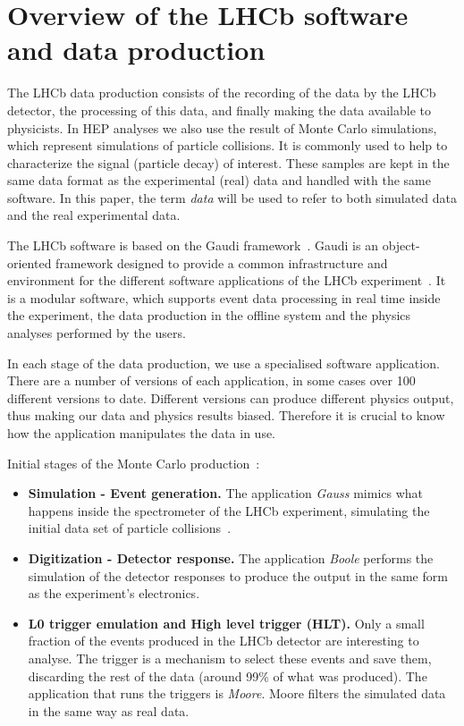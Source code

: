 \section{Overview of the LHCb software and data production}

The LHCb data production consists of the recording of the data by the LHCb detector, the processing of this data, and finally making the data available to physicists. In HEP analyses we also use the result of Monte Carlo simulations, which represent simulations of particle collisions. It is commonly used to help to characterize the signal (particle decay) of interest. These samples are kept in the same data format as the experimental (real) data and handled with the same software. In this paper, the term \emph{data} will be used to refer to both simulated data and the real experimental data.

The LHCb software is based on the Gaudi framework~\cite{barrand2001gaudi}. Gaudi is an object-oriented framework designed to provide a common infrastructure and environment for the different software applications of the LHCb experiment~\cite{corti2006software}. It is a modular software, which supports event data processing in real time inside the experiment, the data production in the offline system and the physics analyses performed by the users.

In each stage of the data production, we use a specialised software application. There are a number of versions of each application, in some cases over 100 different versions to date. Different versions can produce different physics output, thus making our data and physics results biased. Therefore it is crucial to know how the application manipulates the data in use. 


Initial stages of the Monte Carlo production~\cite{corti2015monte}:
\begin{itemize}
    \item \textbf{Simulation - Event generation.} The application {\it Gauss} mimics what happens inside the spectrometer of the LHCb experiment, simulating the initial data set of particle collisions~\cite{corti2006software}.
    \item \textbf{Digitization - Detector response.} The application {\it Boole} performs the simulation of the detector responses to produce the output in the same form as the experiment's electronics. 
    \item \textbf{L0 trigger emulation and  High level trigger (HLT).} Only a small fraction of the events produced in the LHCb detector are interesting to analyse. The trigger is a mechanism to select these events and save them, discarding the rest of the data (around 99\% of what was produced). The application that runs the triggers is {\it Moore}. Moore filters the simulated data in the same way as real data. 
\end{itemize}

